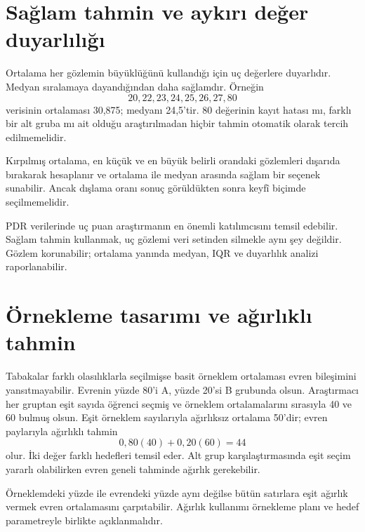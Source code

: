 \section{Sağlam tahmin ve aykırı değer duyarlılığı}

Ortalama her gözlemin büyüklüğünü kullandığı için uç değerlere duyarlıdır.
Medyan sıralamaya dayandığından daha sağlamdır. Örneğin
\[
20,22,23,24,25,26,27,80
\]
verisinin ortalaması 30,875; medyanı 24,5'tir. 80 değerinin kayıt hatası mı,
farklı bir alt gruba mı ait olduğu araştırılmadan hiçbir tahmin otomatik olarak
tercih edilmemelidir.

Kırpılmış ortalama, en küçük ve en büyük belirli orandaki gözlemleri dışarıda
bırakarak hesaplanır ve ortalama ile medyan arasında sağlam bir seçenek
sunabilir. Ancak dışlama oranı sonuç görüldükten sonra keyfî biçimde
seçilmemelidir.

\begin{researchbox}
PDR verilerinde uç puan araştırmanın en önemli katılımcısını temsil edebilir.
Sağlam tahmin kullanmak, uç gözlemi veri setinden silmekle aynı şey değildir.
Gözlem korunabilir; ortalama yanında medyan, IQR ve duyarlılık analizi
raporlanabilir.
\end{researchbox}

\section{Örnekleme tasarımı ve ağırlıklı tahmin}

Tabakalar farklı olasılıklarla seçilmişse basit örneklem ortalaması evren
bileşimini yansıtmayabilir. Evrenin yüzde 80'i A, yüzde 20'si B grubunda olsun.
Araştırmacı her gruptan eşit sayıda öğrenci seçmiş ve örneklem ortalamalarını
sırasıyla 40 ve 60 bulmuş olsun. Eşit örneklem sayılarıyla ağırlıksız ortalama
50'dir; evren paylarıyla ağırlıklı tahmin
\[
0{,}80(40)+0{,}20(60)=44
\]
olur. İki değer farklı hedefleri temsil eder. Alt grup karşılaştırmasında eşit
seçim yararlı olabilirken evren geneli tahminde ağırlık gerekebilir.

\begin{mistakebox}
Örneklemdeki yüzde ile evrendeki yüzde aynı değilse bütün satırlara eşit ağırlık
vermek evren ortalamasını çarpıtabilir. Ağırlık kullanımı örnekleme planı ve
hedef parametreyle birlikte açıklanmalıdır.
\end{mistakebox}


